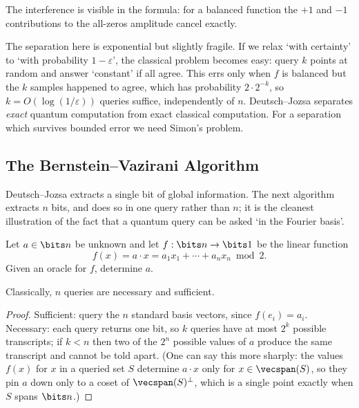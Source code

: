 The interference is visible in the formula: for a balanced function the $+1$ and $-1$ contributions to the all-zeros amplitude cancel exactly.

\begin{remark}
	The separation here is exponential but slightly fragile. If we relax `with certainty' to `with probability $1-\varepsilon$', the classical problem becomes easy: query $k$ points at random and answer `constant' if all agree. This errs only when $f$ is balanced but the $k$ samples happened to agree, which has probability $2\cdot2^{-k}$, so $k = O(\log(1/\varepsilon))$ queries suffice, independently of $n$. Deutsch--Jozsa separates \emph{exact} quantum computation from exact classical computation. For a separation which survives bounded error we need Simon's problem.
\end{remark}

\subsection{The Bernstein--Vazirani Algorithm}\label{sec:bv}

Deutsch--Jozsa extracts a single bit of global information. The next algorithm extracts $n$ bits, and does so in one query rather than $n$; it is the cleanest illustration of the fact that a quantum query can be asked `in the Fourier basis'.

\begin{problem*}
	Let $a\in\bits n$ be unknown and let $f:\bits n\to\bits1$ be the linear function
	$$f(x) = a\cdot x = a_1x_1+\cdots+a_nx_n \bmod 2.$$
	Given an oracle for $f$, determine $a$.
\end{problem*}

\begin{proposition}
	Classically, $n$ queries are necessary and sufficient.
\end{proposition}

\begin{proof}
	Sufficient: query the $n$ standard basis vectors, since $f(e_i) = a_i$. Necessary: each query returns one bit, so $k$ queries have at most $2^k$ possible transcripts; if $k<n$ then two of the $2^n$ possible values of $a$ produce the same transcript and cannot be told apart. (One can say this more sharply: the values $f(x)$ for $x$ in a queried set $S$ determine $a\cdot x$ only for $x\in\vecspan(S)$, so they pin $a$ down only to a coset of $\vecspan(S)^\perp$, which is a single point exactly when $S$ spans $\bits n$.)
\end{proof}


